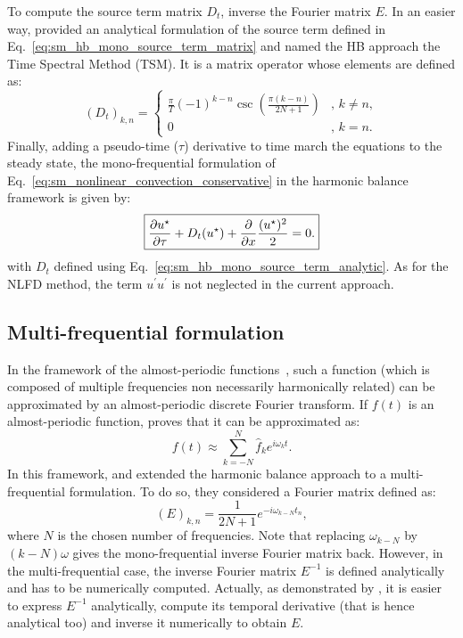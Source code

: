 To compute the source term matrix $D_t$, \citet{Hall2002}
inverse the Fourier matrix $E$.
In an easier way, \citet{Gopinath2005} provided 
an analytical formulation of the source term defined 
in Eq.~\eqref{eq:sm_hb_mono_source_term_matrix} and 
named the HB approach the Time Spectral Method (TSM).
It is a matrix operator whose elements are defined as:
\begin{equation}
  (D_t)_{k, n} =
  \begin{cases}
    \frac{\pi}{T}(-1)^{k-n}\csc\left(\frac{\pi
        (k-n)}{2N+1}\right) &, \, k\neq n,\\
    0 &, \, k=n.
  \end{cases}
  \label{eq:sm_hb_mono_source_term_analytic}
\end{equation}
Finally, adding a pseudo-time ($\tau$) derivative to 
time march the equations to the steady state, 
the mono-frequential formulation of 
Eq.~\eqref{eq:sm_nonlinear_convection_conservative} in the harmonic
balance framework is given by:
\begin{equation}
	\fbox{$
	\displaystyle \frac{\partial u^\star}{\partial \tau} + 
	D_t (u^\star) + 
	\displaystyle \frac{\partial}{\partial x}
		\frac{(u^\star)^2}{2} = 0.
	$}
\end{equation}
with $D_t$ defined using Eq.~\eqref{eq:sm_hb_mono_source_term_analytic}.
As for the NLFD method, the term $u^\prime u^\prime$
is not neglected in the current approach.

\subsection{Multi-frequential formulation}
\label{sec:sm_hb_multi}
In the
framework of the almost-periodic functions~\cite{Besicovitch1932},
such a function (which is composed of multiple
frequencies non necessarily harmonically related) can be approximated
by an almost-periodic
discrete Fourier transform. If $f(t)$ is an almost-periodic function,
\citet{Besicovitch1932} proves that it can be approximated as:
\begin{equation}
	f(t) \approx \sum_{k=-N}^{N} \widehat{f}_k 
	e^{i \omega_k t}.
\end{equation}
In this framework, \citet{Gopinath2007} and \citet{Ekici2007} 
extended the harmonic balance approach to
a multi-frequential formulation. To do so, they considered
a Fourier matrix defined as:
\begin{equation}
	(E)_{k,n} = \frac{1}{2N+1} e^{-i \omega_{k-N} t_n},
\end{equation}
where $N$ is the chosen number of frequencies.
Note that replacing $\omega_{k-N}$ by $(k - N) \omega$ gives
the mono-frequential inverse Fourier matrix back. 
However, in the multi-frequential case, the inverse Fourier matrix
$E^{-1}$ is defined analytically
and has to be numerically computed. Actually, as demonstrated by 
\citet{Gopinath2007}, it is easier to express $E^{-1}$ analytically,
compute its temporal derivative (that is hence analytical too) 
and inverse it numerically to obtain $E$.

